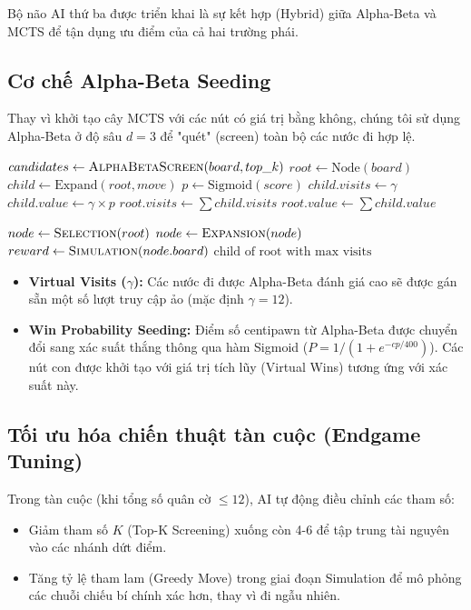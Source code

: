 Bộ não AI thứ ba được triển khai là sự kết hợp (Hybrid) giữa Alpha-Beta và MCTS để tận dụng ưu điểm của cả hai trường phái.

\subsection{Cơ chế Alpha-Beta Seeding}
Thay vì khởi tạo cây MCTS với các nút có giá trị bằng không, chúng tôi sử dụng Alpha-Beta ở độ sâu $d=3$ để "quét" (screen) toàn bộ các nước đi hợp lệ. 

\begin{algorithm}[H]
\caption{Hybrid MCTS+AB (AB-MCTS)}
\begin{algorithmic}[1]
    \State $candidates \gets \Call{AlphaBetaScreen}{board, top\_k}$
    \State $root \gets \text{Node}(board)$
        \State $child \gets \text{Expand}(root, move)$
        \State $p \gets \text{Sigmoid}(score)$
        \State $child.visits \gets \gamma$ 
        \State $child.value \gets \gamma \times p$ 
    \EndFor
    \State $root.visits \gets \sum child.visits$
    \State $root.value \gets \sum child.value$
    
        \State $node \gets \Call{Selection}{root}$
        \State $node \gets \Call{Expansion}{node}$
        \State $reward \gets \Call{Simulation}{node.board}$
        \State {}
    \EndFor
    \State \Return $\text{child of root with max visits}$
\EndFunction
\end{algorithmic}
\end{algorithm}

\begin{itemize}
    \item \textbf{Virtual Visits ($\gamma$):} Các nước đi được Alpha-Beta đánh giá cao sẽ được gán sẵn một số lượt truy cập ảo (mặc định $\gamma = 12$).
    \item \textbf{Win Probability Seeding:} Điểm số centipawn từ Alpha-Beta được chuyển đổi sang xác suất thắng thông qua hàm Sigmoid ($P = 1 / (1 + e^{-cp/400})$). Các nút con được khởi tạo với giá trị tích lũy (Virtual Wins) tương ứng với xác suất này.
\end{itemize}

\subsection{Tối ưu hóa chiến thuật tàn cuộc (Endgame Tuning)}
Trong tàn cuộc (khi tổng số quân cờ $\le 12$), AI tự động điều chỉnh các tham số:
\begin{itemize}
    \item Giảm tham số $K$ (Top-K Screening) xuống còn 4-6 để tập trung tài nguyên vào các nhánh dứt điểm.
    \item Tăng tỷ lệ tham lam (Greedy Move) trong giai đoạn Simulation để mô phỏng các chuỗi chiếu bí chính xác hơn, thay vì đi ngẫu nhiên.
\end{itemize}
